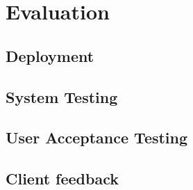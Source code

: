 \chapter{Evaluation}


\section{Deployment}

\section{System Testing}

\section{User Acceptance Testing}

\section{Client feedback}